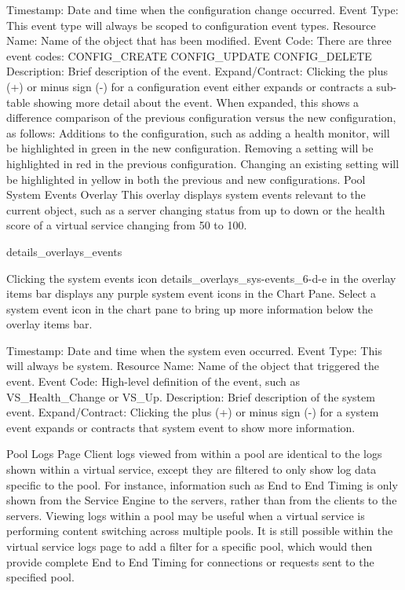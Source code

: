 \documentclass[letterpaper,10pt,english]{sphinxmanual}
\begin{document}
Timestamp: Date and time when the configuration change occurred.
Event Type: This event type will always be scoped to configuration event types.
Resource Name: Name of the object that has been modified.
Event Code: There are three event codes:
CONFIG\_CREATE
CONFIG\_UPDATE
CONFIG\_DELETE
Description: Brief description of the event.
Expand/Contract: Clicking the plus (+) or minus sign (-) for a configuration event either expands or contracts a sub-table showing more detail about the event. When expanded, this shows a difference comparison of the previous configuration versus the new configuration, as follows:
Additions to the configuration, such as adding a health monitor, will be highlighted in green in the new configuration.
Removing a setting will be highlighted in red in the previous configuration.
Changing an existing setting will be highlighted in yellow in both the previous and new configurations.
Pool System Events Overlay
This overlay displays system events relevant to the current object, such as a server changing status from up to down or the health score of a virtual service changing from 50 to 100.

details\_overlays\_events

Clicking the system events icon details\_overlays\_sys-events\_6-d-e in the overlay items bar displays any purple system event icons in the Chart Pane. Select a system event icon in the chart pane to bring up more information below the overlay items bar.

Timestamp: Date and time when the system even occurred.
Event Type: This will always be system.
Resource Name: Name of the object that triggered the event.
Event Code: High-level definition of the event, such as VS\_Health\_Change or VS\_Up.
Description: Brief description of the system event.
Expand/Contract: Clicking the plus (+) or minus sign (-) for a system event expands or contracts that system event to show more information.

Pool Logs Page
Client logs viewed from within a pool are identical to the logs shown within a virtual service, except they are filtered to only show log data specific to the pool.  For instance, information such as End to End Timing is only shown from the Service Engine to the servers, rather than from the clients to the servers. Viewing logs within a pool may be useful when a virtual service is performing content switching across multiple pools. It is still possible within the virtual service logs page to add a filter for a specific pool, which would then provide complete End to End Timing for connections or requests sent to the specified pool.
\end{document}
